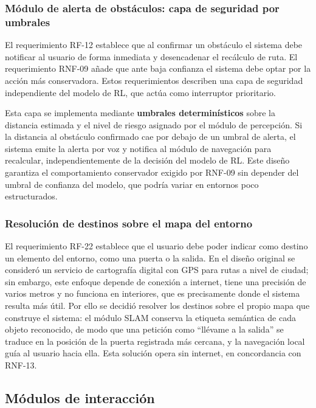 \subsubsection{Módulo de alerta de obstáculos: capa de seguridad por umbrales}

El requerimiento RF-12 establece que al confirmar un obstáculo el sistema debe notificar
al usuario de forma inmediata y desencadenar el recálculo de ruta. El requerimiento
RNF-09 añade que ante baja confianza el sistema debe optar por la acción más
conservadora. Estos requerimientos describen una capa de seguridad independiente del
modelo de RL, que actúa como interruptor prioritario.

Esta capa se implementa mediante \textbf{umbrales determinísticos} sobre la distancia
estimada y el nivel de riesgo asignado por el módulo de percepción. Si la distancia al
obstáculo confirmado cae por debajo de un umbral de alerta, el sistema emite la alerta
por voz y notifica al módulo de navegación para recalcular, independientemente de la
decisión del modelo de RL. Este diseño garantiza el comportamiento conservador exigido
por RNF-09 sin depender del umbral de confianza del modelo, que podría variar en
entornos poco estructurados.

\subsubsection{Resolución de destinos sobre el mapa del entorno}

El requerimiento RF-22 establece que el usuario debe poder indicar como destino un
elemento del entorno, como una puerta o la salida. En el diseño original se consideró
un servicio de cartografía digital con GPS para rutas a nivel de ciudad; sin embargo,
este enfoque depende de conexión a internet, tiene una precisión de varios metros y no
funciona en interiores, que es precisamente donde el sistema resulta más útil. Por
ello se decidió resolver los destinos sobre el propio mapa que construye el sistema:
el módulo SLAM conserva la etiqueta semántica de cada objeto reconocido, de modo que
una petición como ``llévame a la salida'' se traduce en la posición de la puerta
registrada más cercana, y la navegación local guía al usuario hacia ella. Esta
solución opera sin internet, en concordancia con RNF-13.

\subsection{Módulos de interacción}

